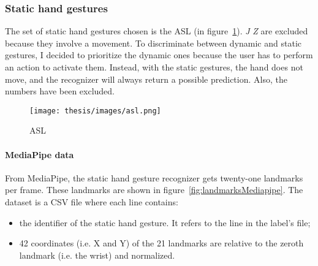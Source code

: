 \documentclass[../thesis.tex]{subfiles}
\begin{document}
\subsubsection{Static hand gestures}
The set of static hand gestures chosen is the \gls{ASL} (in figure~\ref{fig:asl}). \textit{J} \textit{Z} are excluded because they involve a movement. To discriminate between dynamic and static gestures, I decided to prioritize the dynamic ones because the user has to perform an action to activate them. Instead, with the static gestures, the hand does not move, and the recognizer will always return a possible prediction. Also, the numbers have been excluded. 

\begin{figure}
    \centering
    \texttt{[image: thesis/images/asl.png]}
    \caption{\glsdesc{ASL}~\parencite{img:asl}}\label{fig:asl}
\end{figure}

\paragraph{MediaPipe data}
From MediaPipe, the static hand gesture recognizer gets twenty-one landmarks per frame. These landmarks are shown in figure~\ref{fig:landmarksMediapipe}. The dataset is a CSV file where each line contains:
\begin{itemize}
    \item the identifier of the static hand gesture. It refers to the line in the label’s file; 
    \item 42 coordinates (i.e. X and Y) of the 21 landmarks are relative to the zeroth landmark (i.e. the wrist) and normalized. 
\end{itemize}
\end{document}

